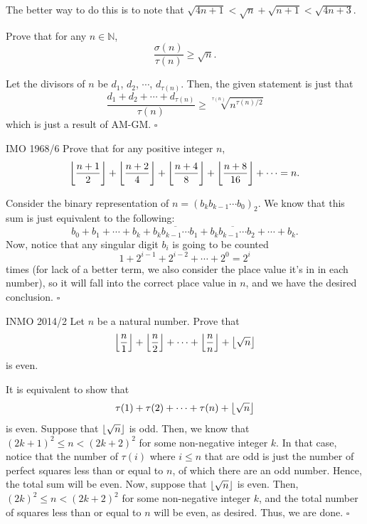 \documentclass{article}
\begin{document}
\begin{remark*}
The better way to do this is to note that $\sqrt{4n+1}<\sqrt{n}+\sqrt{n+1}<\sqrt{4n+3}$.
\end{remark*}

\begin{problem}[3.7.5]{}
Prove that for any $n \in \mathbb{N}$, \[\dfrac{\sigma(n)}{\tau(n)} \ge \sqrt{n}.\]
\end{problem}

Let the divisors of $n$ be $d_1$, $d_2$, $\cdots$, $d_{\tau(n)}$. Then, the given statement is just that \[\dfrac{d_1+d_2+\cdots+d_{\tau(n)}}{\tau(n)} \ge \sqrt[\tau(n)]{n^{\tau(n)/2}}\] which is just a result of AM-GM. $\square$

\begin{problem}[3.7.6]{IMO 1968/6}
Prove that for any positive integer $n$, \[\left\lfloor \dfrac{n + 1}{2} \right\rfloor + \left\lfloor \dfrac{n + 2}{4} \right\rfloor + \left\lfloor \dfrac{n + 4}{8} \right\rfloor + \left\lfloor \dfrac{n + 8}{16} \right\rfloor + \cdots = n.\]
\end{problem}

Consider the binary representation of $n = (b_kb_{k-1}\cdots b_0)_2$. We know that this sum is just equivalent to the following: \[b_0+b_1+\cdots+b_k+\overline{b_kb_{k-1}\cdots b_1}+\overline{b_kb_{k-1}\cdots b_2} + \cdots + b_k.\] Now, notice that any singular digit $b_i$ is going to be counted \[1+2^{i-1}+2^{i-2}+\cdots+2^0 = 2^i\] times (for lack of a better term, we also consider the place value it's in in each number), so it will fall into the correct place value in $n$, and we have the desired conclusion. $\square$

\begin{problem}[3.7.7]{INMO 2014/2}
Let $n$ be a natural number. Prove that \[\left\lfloor \dfrac{n}{1} \right\rfloor+\left\lfloor \dfrac{n}{2} \right\rfloor+\cdots+\left\lfloor \dfrac{n}{n} \right\rfloor+\left\lfloor \sqrt{n} \right\rfloor\] is even.
\end{problem}

It is equivalent to show that \[\tau(1)+\tau(2)+\cdots+\tau(n)+\left\lfloor \sqrt{n} \right\rfloor\] is even. Suppose that $\left\lfloor \sqrt{n} \right\rfloor$ is odd. Then, we know that $(2k+1)^2 \le n < (2k+2)^2$ for some non-negative integer $k$. In that case, notice that the number of $\tau(i)$ where $i \le n$ that are odd is just the number of perfect squares less than or equal to $n$, of which there are an odd number. Hence, the total sum will be even. Now, suppose that $\left\lfloor \sqrt{n} \right\rfloor$ is even. Then, $(2k)^2 \le n < (2k+2)^2$ for some non-negative integer $k$, and the total number of squares less than or equal to $n$ will be even, as desired. Thus, we are done. $\square$
\end{document}
